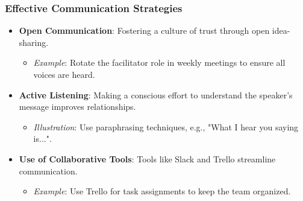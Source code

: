 \documentclass[aspectratio=169]{beamer}
\begin{document}
\begin{frame}[fragile]
    \frametitle{Effective Communication Strategies}
    \begin{itemize}
        \item \textbf{Open Communication}: Fostering a culture of trust through open idea-sharing.
        \begin{itemize}
            \item \textit{Example}: Rotate the facilitator role in weekly meetings to ensure all voices are heard.
        \end{itemize}
        
        \item \textbf{Active Listening}: Making a conscious effort to understand the speaker’s message improves relationships.
        \begin{itemize}
            \item \textit{Illustration}: Use paraphrasing techniques, e.g., "What I hear you saying is...".
        \end{itemize}

        \item \textbf{Use of Collaborative Tools}: Tools like Slack and Trello streamline communication.
        \begin{itemize}
            \item \textit{Example}: Use Trello for task assignments to keep the team organized.
        \end{itemize}
    \end{itemize}
\end{frame}
\end{document}
